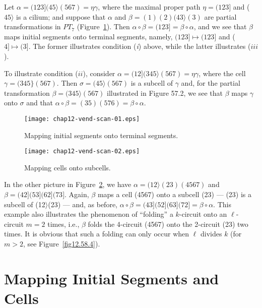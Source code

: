 \documentclass{surv-l}
\numberwithin{equation}{section}
\numberwithin{table}{section}
\numberwithin{figure}{section}
\theoremstyle{plain}
\theoremstyle{definition}
\begin{document}
Let $\alpha=(123](45\rangle(567)=\eta\gamma$, where the maximal
proper path $\eta=(123]$ and ($45\rangle$ is a cilium; and suppose
that $\alpha$ and $\beta=(1)(2)(43\rangle(3)$ are partial
transformations in $PT_{7}$ (Figure~\ref{fig12.57.1}). Then
$\alpha \circ\beta=(123]=\beta \circ\alpha$, and we see that
$\beta$ maps initial segments onto terminal segments, namely,
$(123]\mapsto(123]$ and ($4]\mapsto(3]$. The former illustrates
condition (\emph{i}) above, while the latter illustrates ($iii$).

To illustrate condition ($ii$), consider
$\alpha=(12](345\rangle(567)=\eta\gamma$, where the cell
$\gamma=(345\}(567)$. Then $\sigma=(45\rangle(567)$ is a subcell
of $\gamma$ and, for the partial transformation
$\beta=(345\rangle(567)$ illustrated in Figure 57.2, we see that
$\beta$ maps $\gamma$ onto $\sigma$ and that $\alpha
\circ\beta=(35)(576)=\beta \circ\alpha$.

\begin{figure}[!h]
\texttt{[image: chap12-vend-scan-01.eps]}
\caption{Mapping initial segments onto terminal segments.}\label{fig12.57.1}
\end{figure}

\begin{figure}[!h]
\texttt{[image: chap12-vend-scan-02.eps]}
\caption{Mapping cells onto subcells.}\label{fig12.57.2}
\end{figure}

In the other picture in Figure~\ref{fig12.57.2}, we have
$\alpha=(12\rangle(23)(4567)$ and $\beta= (42](53](62](73]$.
Again, $\beta$ maps a cell (4567) onto a subcell (23) --- (23) is
a subcell of (12$\rangle$(23) --- and, as before, $\alpha
\circ\beta=(43](52](63](72]=\beta \circ\alpha$. This example also
illustrates the phenomenon of ``folding'' a $k$-circuit onto an
$\ell$-circuit $m=2$ times, i.e., $\beta$ folds the 4-circuit
(4567) onto the 2-circuit (23) two times. It is obvious that such
a folding can only occur when $\ell$ divides $k$ (for $m>2$, see
Figure~\ref{fig12.58.4}).

\section{Mapping Initial Segments and Cells}\label{sec12.58}
\end{document}
